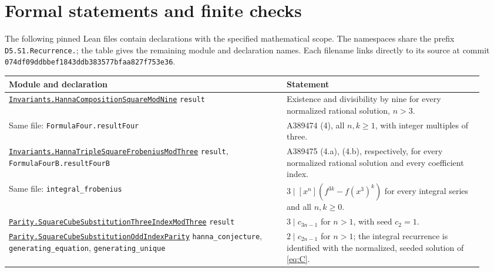 \documentclass[11pt]{article}
\newcommand{\leanroot}{https://github.com/the-omega-institute/trureturing/blob/074df09ddbbef1843ddb383577bfaa827f753e36}
\begin{document}
\section{Formal statements and finite checks}

The following pinned Lean files contain declarations with the specified
mathematical scope. The namespaces share the prefix
\nolinkurl{D5.S1.Recurrence.}; the table gives the remaining module and
declaration names. Each filename links directly to its source at commit
\nolinkurl{074df09ddbbef1843ddb383577bfaa827f753e36}.

\begingroup\small
\begin{longtable}{@{}p{0.55\linewidth}p{0.39\linewidth}@{}}
\toprule
Module and declaration & Statement\\
\midrule
\endhead
\href{\leanroot/D5/S1/Recurrence/Invariants/HannaCompositionSquareModNine.lean}
{\nolinkurl{Invariants.HannaCompositionSquareModNine}}\newline
\nolinkurl{result} & Existence and divisibility by nine for every
normalized rational solution, $n>3$.\\[3pt]
Same file: \nolinkurl{FormulaFour.resultFour} & A389474 (4),
all $n,k\ge1$, with integer multiples of three.\\[3pt]
\href{\leanroot/D5/S1/Recurrence/Invariants/HannaTripleSquareFrobeniusModThree.lean}
{\nolinkurl{Invariants.HannaTripleSquareFrobeniusModThree}}\newline
\nolinkurl{result}, \nolinkurl{FormulaFourB.resultFourB} &
A389475 (4.a), (4.b), respectively, for every normalized rational solution
and every coefficient index.\\[3pt]
Same file: \nolinkurl{integral_frobenius} &
$3\mid[x^n](f^{3k}-f(x^3)^k)$ for every integral series and all $n,k\ge0$.\\[3pt]
\href{\leanroot/D5/S1/Recurrence/Parity/SquareCubeSubstitutionThreeIndexModThree.lean}
{\nolinkurl{Parity.SquareCubeSubstitutionThreeIndexModThree}}\newline
\nolinkurl{result} & $3\mid c_{3n-1}$ for $n>1$, with seed $c_2=1$.\\[3pt]
\href{\leanroot/D5/S1/Recurrence/Parity/SquareCubeSubstitutionOddIndexParity.lean}
{\nolinkurl{Parity.SquareCubeSubstitutionOddIndexParity}}\newline
\nolinkurl{hanna_conjecture}, \nolinkurl{generating_equation},
\nolinkurl{generating_unique} &
$2\mid c_{2n-1}$ for $n>1$; the integral recurrence is identified with
the normalized, seeded solution of \eqref{eq:C}.\\
\bottomrule
\end{longtable}
\endgroup
\end{document}
